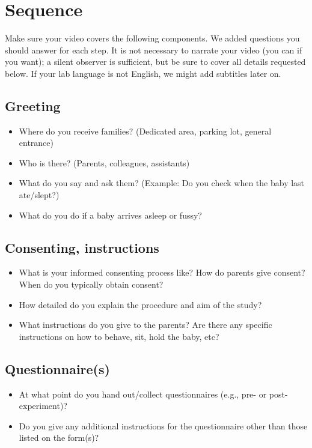 \documentclass[
  letterpaper,
  DIV=11,
  numbers=noendperiod,
  oneside]{scrreprt}
\providecommand{\tightlist}{%
  \setlength{\itemsep}{0pt}\setlength{\parskip}{0pt}}
\begin{document}
\section{Sequence}\label{sequence}

Make sure your video covers the following components. We added questions
you should answer for each step. It is not necessary to narrate your
video (you can if you want); a silent observer is sufficient, but be
sure to cover all details requested below. If your lab language is not
English, we might add subtitles later on.

\subsection{Greeting}\label{greeting}

\begin{itemize}
\tightlist
\item
  Where do you receive families? (Dedicated area, parking lot, general
  entrance)
\item
  Who is there? (Parents, colleagues, assistants)
\item
  What do you say and ask them? (Example: Do you check when the baby
  last ate/slept?)
\item
  What do you do if a baby arrives asleep or fussy?
\end{itemize}

\subsection{Consenting, instructions}\label{consenting-instructions}

\begin{itemize}
\tightlist
\item
  What is your informed consenting process like? How do parents give
  consent? When do you typically obtain consent?
\item
  How detailed do you explain the procedure and aim of the study?
\item
  What instructions do you give to the parents? Are there any specific
  instructions on how to behave, sit, hold the baby, etc?
\end{itemize}

\subsection{Questionnaire(s)}\label{questionnaires}

\begin{itemize}
\tightlist
\item
  At what point do you hand out/collect questionnaires (e.g., pre- or
  post-experiment)?
\item
  Do you give any additional instructions for the questionnaire other
  than those listed on the form(s)?
\end{itemize}
\end{document}
